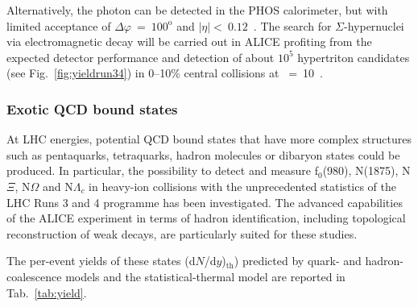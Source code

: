Alternatively, the photon can be detected in the PHOS calorimeter, but with limited acceptance of $\Delta\varphi~=~100^{\mathrm{o}}$ and $\vert\eta\vert<~0.12$~\cite{Abelev:2014ffa}.
The search for $\Sigma$-hypernuclei via electromagnetic decay will be carried out in ALICE profiting from the expected detector performance and detection of about $10^5$ hypertriton candidates (see Fig.~\ref{fig:yieldrun34}) in 0--10\% central \PbPb collisions at \Lint~=~10~\nbInv.

\subsubsection{Exotic QCD bound states}
At LHC energies, potential QCD bound states that have more complex structures such as pentaquarks, tetraquarks, hadron molecules or dibaryon states could be produced.
In particular, the possibility to detect and measure f$_{0}$(980), N(1875), N$\Xi$, N$\Omega$ and N$\Lambda_c$ in heavy-ion collisions with the unprecedented statistics of the LHC Runs 3 and 4 programme has been investigated. The advanced capabilities of the ALICE experiment in terms of hadron identification, including topological reconstruction of weak decays, are particularly suited for these studies.

The per-event yields of these states (d$N$/d$y$)$_{\mathrm{th}}$) predicted by quark- and hadron-coalescence models \cite{Cho:2017dcy} and the statistical-thermal model \cite{Andronic:2017} are reported in Tab.~\ref{tab:yield}.

